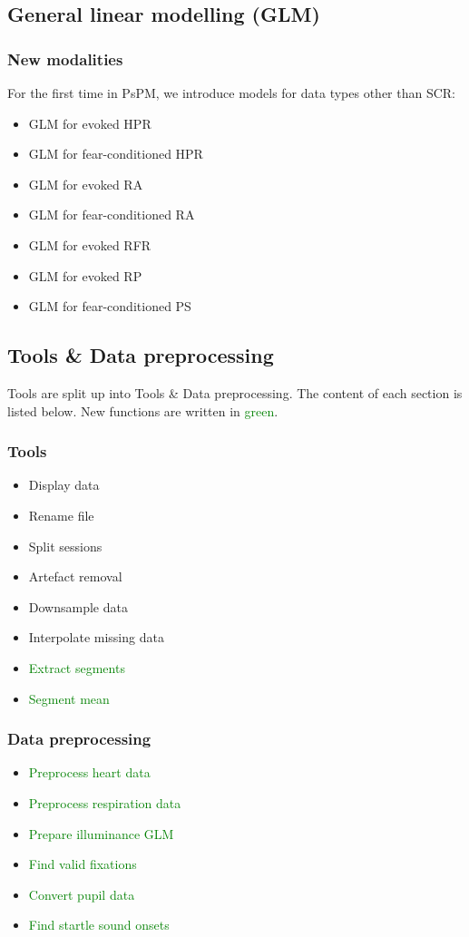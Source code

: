 \documentclass[english]{article}
\numberwithin{equation}{section}
\numberwithin{figure}{section}
\begin{document}
\subsection*{General linear modelling (GLM)}

\subsubsection*{New modalities}

For the first time in PsPM, we introduce models for data types other
than SCR:
\begin{itemize}
\item GLM for evoked HPR
\item GLM for fear-conditioned HPR
\item GLM for evoked RA
\item GLM for fear-conditioned RA
\item GLM for evoked RFR
\item GLM for evoked RP
\item GLM for fear-conditioned PS
\end{itemize}

\subsection*{Tools \& Data preprocessing}

Tools are split up into Tools \& Data preprocessing. The content of
each section is listed below. New functions are written in \textcolor{green}{green}.

\subsubsection*{Tools}
\begin{itemize}
\item Display data
\item Rename file
\item Split sessions
\item Artefact removal
\item Downsample data
\item Interpolate missing data
\item \textcolor{green}{Extract segments}
\item \textcolor{green}{Segment mean}
\end{itemize}

\subsubsection*{Data preprocessing}
\begin{itemize}
\item \textcolor{green}{Preprocess heart data}
\item \textcolor{green}{Preprocess respiration data}
\item \textcolor{green}{Prepare illuminance GLM}
\item \textcolor{green}{Find valid fixations}
\item \textcolor{green}{Convert pupil data}
\item \textcolor{green}{Find startle sound onsets}
\end{itemize}
\end{document}
